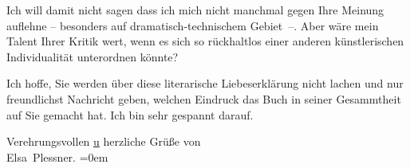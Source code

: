 \pstart
           Ich will damit nicht sagen dass ich mich nicht manchmal gegen Ihre Meinung auflehne –
               besonders auf dramatisch-technischem Gebiet –. Aber wäre mein Talent Ihrer Kritik
               wert, {\pb}wenn es sich so rückhaltlos einer anderen künstlerischen
               Individualität unterordnen könnte?\pend
           
\pstart
           Ich hoffe, Sie werden über diese literarische Liebeserklärung nicht lachen und nur
               freundlichst Nachricht geben, welchen Eindruck das Buch in seiner Gesammtheit auf Sie gemacht hat. Ich bin
               sehr gespannt darauf.\pend
           
\pstart
           Verehrungsvollen \uline{u} herzliche Grüße von{\\[\baselineskip]}\spacefill\mbox{Elsa Plessner}. \pend
           \leftskip=0em{}\endnumbering{}
\begin{anhang}
\end{anhang}
      